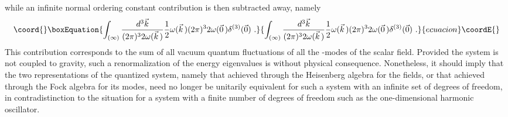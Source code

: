 \documentclass[a4paper,11pt]{article}
\begin{document}
while an infinite normal ordering constant contribution is then
subtracted away, namely
\begin{equation}\coord{}\boxEquation{
\int_{(\infty)}\frac{d^3\vec{k}}{(2\pi)^32\omega(\vec{k}\,)}
\frac{1}{2}\omega(\vec{k}\,)(2\pi)^32\omega(\vec{0}\,)\delta^{(3)}(\vec{0})\ .
}{
\int_{(\infty)}\frac{d^3\vec{k}}{(2\pi)^32\omega(\vec{k}\,)}
\frac{1}{2}\omega(\vec{k}\,)(2\pi)^32\omega(\vec{0}\,)\delta^{(3)}(\vec{0})\ .
}{ecuacion}\coordE{}\end{equation}
This contribution corresponds to the sum of all vacuum quantum fluctuations
of all the \coordHE{}-modes of the scalar field. Provided the system is
not coupled to gravity, such a renormalization of the energy eigenvalues
is without physical consequence. Nonetheless, it should imply that the
two representations of the quantized system, namely that achieved through
the Heisenberg algebra for the fields, or that achieved through the
Fock algebra for its modes, need no longer be unitarily equivalent
for such a system with an infinite set of degrees of freedom,\cite{CCR} in
contradistinction to the situation for a system with a finite number
of degrees of freedom such as the one-dimensional harmonic oscillator.
\end{document}
